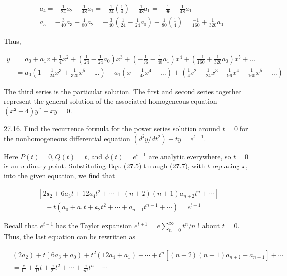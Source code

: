 \documentclass[10pt]{article}
\begin{document}
$$
\begin{aligned}
& a_{4}=-\frac{1}{24} a_{2}-\frac{1}{48} a_{1}=-\frac{1}{24}\left(\frac{1}{4}\right)-\frac{1}{48} a_{1}=-\frac{1}{96}-\frac{1}{48} a_{1} \\
& a_{5}=-\frac{3}{40} a_{3}-\frac{1}{80} a_{2}=-\frac{3}{40}\left(\frac{1}{24}-\frac{1}{24} a_{0}\right)-\frac{1}{80}\left(\frac{1}{4}\right)=\frac{-1}{160}+\frac{1}{320} a_{0}
\end{aligned}
$$

Thus,

$$
\begin{aligned}
y & =a_{0}+a_{1} x+\frac{1}{4} x^{2}+\left(\frac{1}{24}-\frac{1}{24} a_{0}\right) x^{3}+\left(-\frac{1}{96}-\frac{1}{48} a_{1}\right) x^{4}+\left(\frac{-1}{160}+\frac{1}{320} a_{0}\right) x^{5}+\ldots \\
& =a_{0}\left(1-\frac{1}{24} x^{3}+\frac{1}{320} x^{5}+\ldots\right)+a_{1}\left(x-\frac{1}{48} x^{4}+\ldots\right)+\left(\frac{1}{4} x^{2}+\frac{1}{24} x^{3}-\frac{1}{96} x^{4}-\frac{1}{160} x^{5}+\ldots\right)
\end{aligned}
$$

The third series is the particular solution. The first and second series together represent the general solution of the associated homogeneous equation $\left(x^{2}+4\right) y^{\prime \prime}+x y=0$.

27.16. Find the recurrence formula for the power series solution around $t=0$ for the nonhomogeneous differential equation $\left(d^{2} y / d t^{2}\right)+t y=e^{t+1}$.

Here $P(t)=0, Q(t)=t$, and $\phi(t)=e^{t+1}$ are analytic everywhere, so $t=0$ is an ordinary point. Substituting Eqs. (27.5) through (27.7), with $t$ replacing $x$, into the given equation, we find that

$$
\begin{gathered}
{\left[2 a_{2}+6 a_{3} t+12 a_{4} t^{2}+\cdots+(n+2)(n+1) a_{n+2} t^{n}+\cdots\right]} \\
\quad+t\left(a_{0}+a_{1} t+a_{2} t^{2}+\cdots+a_{n-1} t^{n-1}+\cdots\right)=e^{t+1}
\end{gathered}
$$

Recall that $e^{t+1}$ has the Taylor expansion $e^{t+1}=e \sum_{n=0}^{\infty} t^{n} / n$ ! about $t=0$. Thus, the last equation can be rewritten as

$$
\begin{aligned}
& \left(2 a_{2}\right)+t\left(6 a_{3}+a_{0}\right)+t^{2}\left(12 a_{4}+a_{1}\right)+\cdots+t^{n}\left[(n+2)(n+1) a_{n+2}+a_{n-1}\right]+\cdots \\
& =\frac{e}{0 !}+\frac{e}{1 !} t+\frac{e}{2 !} t^{2}+\cdots+\frac{e}{n !} t^{n}+\cdots
\end{aligned}
$$
\end{document}
